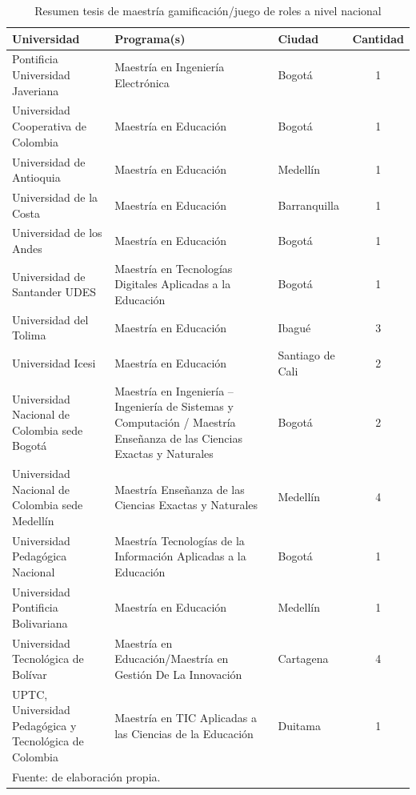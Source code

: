 \begin{table}[!htb]
\caption{Resumen tesis de maestría gamificación/juego de roles a nivel nacional}
\label{tab:resumenlocal}
\begin{center}
\footnotesize
\begin{tabular}{ p{50mm} p{50mm} p{15mm} c}
\toprule
	\textbf{Universidad} & \textbf{Programa(s)} & \textbf{Ciudad} & \textbf{Cantidad}\\ 
\midrule
	Pontificia Universidad Javeriana & Maestría en Ingeniería Electrónica & Bogotá & 1\\
	Universidad Cooperativa de Colombia & Maestría en Educación & Bogotá & 1\\
	Universidad de Antioquia & Maestría en Educación & Medellín & 1\\
	Universidad de la Costa & Maestría en Educación & Barranquilla & 1\\
	Universidad de los Andes & Maestría en Educación & Bogotá & 1\\
	Universidad de Santander UDES & Maestría en Tecnologías Digitales Aplicadas a la Educación & Bogotá & 
	1\\ 
	Universidad del Tolima & Maestría en Educación & Ibagué & 3\\
	Universidad Icesi & Maestría en Educación & Santiago de Cali & 2\\
	Universidad Nacional de Colombia sede Bogotá & Maestría en Ingeniería – Ingeniería de Sistemas y 
		Computación / Maestría Enseñanza de las Ciencias Exactas y Naturales & Bogotá & 2\\
	Universidad Nacional de Colombia sede Medellín & Maestría Enseñanza de las Ciencias Exactas y 
		Naturales & Medellín & 4\\
	Universidad Pedagógica Nacional & Maestría Tecnologías de la Información Aplicadas a la Educación & 
		Bogotá & 1\\
	Universidad Pontificia Bolivariana & Maestría en Educación & Medellín & 1\\
	Universidad Tecnológica de Bolívar & Maestría en Educación/Maestría en Gestión De La Innovación & 
		Cartagena &  4\\
	UPTC, Universidad Pedagógica y Tecnológica de Colombia & Maestría en TIC Aplicadas a las Ciencias de 
		la Educación & Duitama & 1\\
\bottomrule
	\multicolumn{4}{l}{\footnotesize Fuente: de elaboración propia.}\\
\end{tabular}
\end{center}
\end{table}

